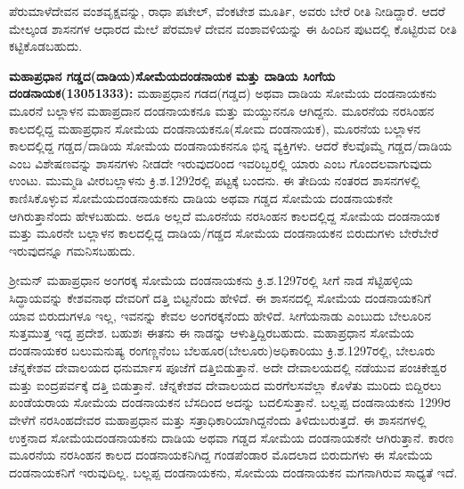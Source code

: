 \vskip 2pt

ಪೆರುಮಾಳೆದೇವನ ವಂಶವೃಕ್ಷವನ್ನು, ರಾಧಾ ಪಟೇಲ್​, ವೆಂಕಟೇಶ ಮೂರ್ತಿ, ಅವರು ಬೇರೆ ರೀತಿ ನೀಡಿದ್ದಾರೆ. ಆದರೆ ಮೇಲ್ಕಂಡ ಶಾಸನಗಳ ಆಧಾರದ ಮೇಲೆ ಪೆರಮಾಳೆ ದೇವನ ವಂಶಾವಳಿಯನ್ನು ಈ ಹಿಂದಿನ ಪುಟದಲ್ಲಿ ಕೊಟ್ಟಿರುವ ರೀತಿ ಕಟ್ಟಿಕೊಡಬಹುದು.

\vskip 2pt

\textbf{ಮಹಾಪ್ರಧಾನ ಗಡ್ಡದ(ದಾಡಿಯ)ಸೋಮೆಯದಂಡನಾಯಕ ಮತ್ತು ದಾಡಿಯ ಸಿಂಗೆಯ ದಂಡನಾಯಕ(1305\general{\enginline{-}}1333):} ಮಹಾಪ್ರಧಾನ ಗಡದ(ಗಡ್ಡದ) ಅಥವಾ ದಾಡಿಯ ಸೋಮೆಯ ದಂಡನಾಯಕನು ಮೂರನೆ ಬಲ್ಲಾಳನ ಮಹಾಪ್ರದಾನ ದಂಡನಾಯಕನೂ ಮತ್ತು ಮಯ್ದುನನೂ ಆಗಿದ್ದನು. ಮೂರನೆಯ ನರಸಿಂಹನ ಕಾಲದಲ್ಲಿದ್ದ ಮಹಾಪ್ರಧಾನ ಸೋಮೆಯ ದಂಡನಾಯಕನೂ(ಸೋಮ ದಂಡನಾಯಕ), ಮೂರನೆಯ ಬಲ್ಲಾಳನ ಕಾಲದಲ್ಲಿದ್ದ ಗಡ್ಡದ/ದಾಡಿಯ ಸೋಮೆಯ ದಂಡ\-ನಾಯಕನನೂ ಭಿನ್ನ ವ್ಯಕ್ತಿಗಳು. ಆದರೆ ಕೆಲವೊಮ್ಮೆ ಗಡ್ಡದ/ದಾಡಿಯ ಎಂಬ ವಿಶೇಷಣವನ್ನು ಶಾಸನಗಳು ನೀಡದೇ ಇರುವುದರಿಂದ ಇವರಿಬ್ಬರಲ್ಲಿ ಯಾರು ಎಂಬ ಗೊಂದಲವಾಗುವುದು ಉಂಟು. ಮುಮ್ಮಡಿ ವೀರಬಲ್ಲಾಳನು ಕ್ರಿ.ಶ.1292ರಲ್ಲಿ ಪಟ್ಟಕ್ಕೆ ಬಂದನು. ಈ ತೇದಿಯ ನಂತರದ ಶಾಸನಗಳಲ್ಲಿ ಕಾಣಿಸಿಕೊಳ್ಳುವ ಸೋಮೆಯದಂಡನಾಯಕನು ದಾಡಿಯ ಅಥವಾ ಗಡ್ಡದ ಸೋಮೆಯ ದಂಡನಾಯಕನೇ ಆಗಿರುತ್ತಾನೆಂದು ಹೇಳಬಹುದು. ಅದೂ ಅಲ್ಲದೆ ಮೂರನೆಯ ನರಸಿಂಹನ ಕಾಲದಲ್ಲಿದ್ದ ಸೋಮೆಯ ದಂಡನಾಯಕ ಮತ್ತು ಮೂರನೇ ಬಲ್ಲಾಳನ ಕಾಲದಲ್ಲಿದ್ದ ದಾಡಿಯ/ಗಡ್ಡದ ಸೋಮೆಯ ದಂಡನಾಯಕನ ಬಿರುದುಗಳು ಬೇರೆಬೇರೆ ಇರುವುದನ್ನೂ ಗಮನಿಸಬಹುದು.

\vskip 2pt

ಶ‍್ರೀಮನ್​ ಮಹಾಪ್ರಧಾನ ಅಂಗರಕ್ಕ ಸೋಮೆಯ ದಂಡನಾಯಕನು ಕ್ರಿ.ಶ.1297ರಲ್ಲಿ ಸೀಗೆ ನಾಡ ಸೆಟ್ಟಿಹಳ್ಳಿಯ ಸಿದ್ಧಾಯವನ್ನು ಕೇಶವನಾಥ ದೇವರಿಗೆ ದತ್ತಿ ಬಿಟ್ಟನೆಂದು ಹೇಳಿದೆ. ಈ ಶಾಸನದಲ್ಲಿ ಸೋಮೆಯ ದಂಡನಾಯಕನಿಗೆ ಯಾವ ಬಿರುದುಗಳೂ ಇಲ್ಲ, ಇವನನ್ನು ಕೇವಲ ಅಂಗರಕ್ಕನೆಂದು ಹೇಳಿದೆ. ಸೀಗೆಯನಾಡು ಎಂಬುದು ಬೇಲೂರಿನ ಸುತ್ತಮುತ್ತ ಇದ್ದ ಪ್ರದೇಶ. ಬಹುಶಃ ಈತನು ಈ ನಾಡನ್ನು ಆಳುತ್ತಿದ್ದಿರಬಹುದು. ಮಹಾಪ್ರಧಾನ ಸೋಮೆಯ ದಂಡನಾಯಕರ ಬಲುಮನುಷ್ಯ ರಂಗಣ್ಣನೆಂಬ ಬೆಲಹೂರ(ಬೇಲೂರು)ಅಧಿಕಾರಿಯು ಕ್ರಿ.ಶ.1297ರಲ್ಲಿ, ಬೇಲೂರು ಚೆನ್ನಕೇಶವ ದೇವಾಲಯದ ಧನುರ್ಮಾಸ ಪೂಜೆಗೆ ದತ್ತಿಬಿಡುತ್ತಾನೆ. ಅದೇ ದೇವಾಲಯದಲ್ಲಿ ನಡೆಯುವ ಪಂಚಿಕೇಶ್ವರ ಮತ್ತು ಐಂದ್ರಪರ್ವಕ್ಕೆ ದತ್ತಿ ಬಿಡುತ್ತಾನೆ. ಚೆನ್ನಕೇಶವ ದೇವಾಲಯದ ಮರಗೆಲಸವೆಲ್ಲಾ ಕೊಳೆತು ಮುರಿದು ಬಿದ್ದಿರಲು ಖಂಡೆಯರಾಯ ಸೋಮೆಯ ದಂಡನಾಯಕನ ಬೆಸದಿಂದ ಅದನ್ನು ಬದಲಿಸುತ್ತಾನೆ. ಬಲ್ಲಪ್ಪ ದಂಡನಾಯಕನು 1299ರ ವೇಳೆಗೆ ನರಸಿಂಹದೇವರ ಮಹಾಪ್ರಧಾನ ಮತ್ತು ಸತ್ರಾಧಿಕಾರಿಯಾಗಿದ್ದನೆಂದು ತಿಳಿದುಬರುತ್ತದೆ. ಈ ಶಾಸನಗಳಲ್ಲಿ ಉಕ್ತನಾದ ಸೋಮೆಯದಂಡನಾಯಕನು ದಾಡಿಯ ಅಥವಾ ಗಡ್ಡದ ಸೋಮೆಯ ದಂಡನಾಯಕನೇ ಆಗಿರುತ್ತಾನೆ. ಕಾರಣ ಮೂರನೆಯ ನರಸಿಂಹನ ಕಾಲದ ದಂಡನಾಯಕನಿಗಿದ್ದ ಗಂಡಪೆಂಡಾರ ಮೊದಲಾದ ಬಿರುದುಗಳು ಈ ಸೋಮೆಯ ದಂಡನಾಯಕನಿಗೆ ಇರುವುದಿಲ್ಲ. ಬಲ್ಲಪ್ಪ ದಂಡನಾಯಕನು, ಸೋಮೆಯ ದಂಡನಾಯಕನ ಮಗನಾಗಿರುವ ಸಾಧ್ಯತೆ ಇದೆ.

